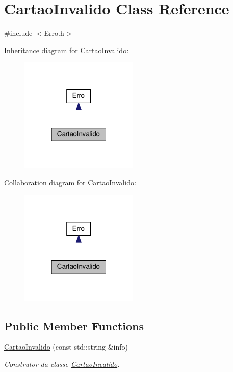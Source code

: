 \hypertarget{classCartaoInvalido}{}\section{Cartao\+Invalido Class Reference}
\label{classCartaoInvalido}


{\ttfamily \#include $<$Erro.\+h$>$}



Inheritance diagram for Cartao\+Invalido\+:
\nopagebreak
\begin{figure}[H]
\begin{center}
\leavevmode
\includegraphics[width=160pt]{classCartaoInvalido__inherit__graph}
\end{center}
\end{figure}


Collaboration diagram for Cartao\+Invalido\+:
\nopagebreak
\begin{figure}[H]
\begin{center}
\leavevmode
\includegraphics[width=160pt]{classCartaoInvalido__coll__graph}
\end{center}
\end{figure}
\subsection*{Public Member Functions}
\begin{DoxyCompactItemize}
\item 
\hyperlink{classCartaoInvalido_a24653e20aedf639b42cd9ed8a56bdc83}{Cartao\+Invalido} (const std\+::string \&info)
\begin{DoxyCompactList}\small\item\em Construtor da classe \hyperlink{classCartaoInvalido}{Cartao\+Invalido}. \end{DoxyCompactList}\end{DoxyCompactItemize}


